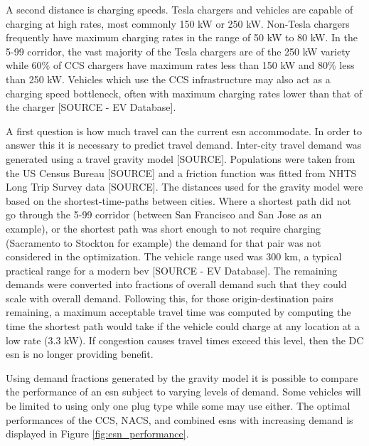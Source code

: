 A second distance is charging speeds. Tesla chargers and vehicles are capable of charging at high rates, most commonly 150 kW or 250 kW. Non-Tesla chargers frequently have maximum charging rates in the range of 50 kW to 80 kW. In the 5-99 corridor, the vast majority of the Tesla chargers are of the 250 kW variety while 60\% of CCS chargers have maximum rates less than 150 kW and 80\% less than 250 kW. Vehicles which use the CCS infrastructure may also act as a charging speed bottleneck, often with maximum charging rates lower than that of the charger [SOURCE - EV Database].

A first question is how much travel can the current \gls{esn} accommodate. In order to answer this it is necessary to predict travel demand. Inter-city travel demand was generated using a travel gravity model [SOURCE]. Populations were taken from the US Census Bureau [SOURCE] and a friction function was fitted from NHTS Long Trip Survey data [SOURCE]. The distances used for the gravity model were based on the shortest-time-paths between cities. Where a shortest path did not go through the 5-99 corridor (between San Francisco and San Jose as an example), or the shortest path was short enough to not require charging (Sacramento to Stockton for example) the demand for that pair was not considered in the optimization. The vehicle range used was 300 km, a typical practical range for a modern \gls{bev} [SOURCE - EV Database]. The remaining demands were converted into fractions of overall demand such that they could scale with overall demand. Following this, for those origin-destination pairs remaining, a maximum acceptable travel time was computed by computing the time the shortest path would take if the vehicle could charge at any location at a low rate (3.3 kW). If congestion causes travel times exceed this level, then the DC \gls{esn} is no longer providing benefit.

Using demand fractions generated by the gravity model it is possible to compare the performance of an \gls{esn} subject to varying levels of demand. Some vehicles will be limited to using only one plug type while some may use either. The optimal performances of the CCS, NACS, and combined \glspl{esn} with increasing demand is displayed in Figure \ref{fig:esn_performance}.

